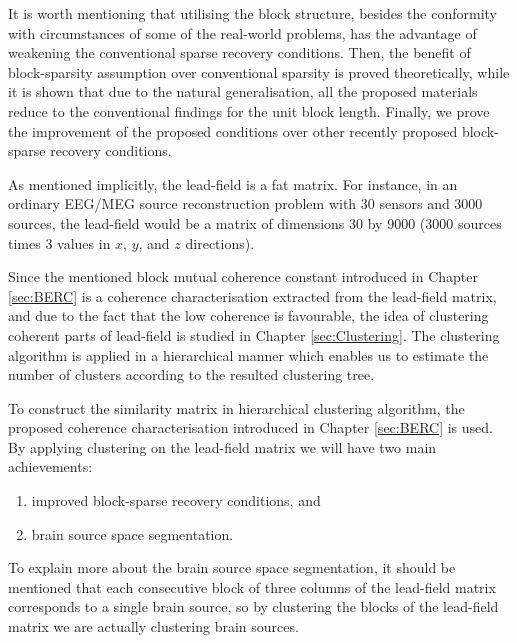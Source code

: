 It is worth mentioning that utilising the block structure, besides the conformity with circumstances of some of the real-world problems, has the advantage of weakening the conventional sparse recovery conditions.
Then, the benefit of block-sparsity assumption over conventional sparsity is proved theoretically, while it is shown that due to the natural generalisation, all the proposed materials reduce to the conventional findings for the unit block length.
Finally, we prove the improvement of the proposed conditions over other recently proposed block-sparse recovery conditions.

As mentioned implicitly, the lead-field is a fat matrix.
For instance, in an ordinary EEG/MEG source reconstruction problem with 30 sensors and 3000 sources, the lead-field would be a matrix of dimensions 30 by 9000 (3000 sources times 3 values in $x$, $y$, and $z$ directions).

Since the mentioned block mutual coherence constant introduced in Chapter \ref{sec:BERC} is a coherence characterisation extracted from the lead-field matrix, and due to the fact that the low coherence is favourable, the idea of clustering coherent parts of lead-field is studied in Chapter \ref{sec:Clustering}.
The clustering algorithm is applied in a hierarchical manner which enables us to estimate the number of clusters according to the resulted clustering tree. 

To construct the similarity matrix in hierarchical clustering algorithm, the proposed coherence characterisation introduced in Chapter \ref{sec:BERC} is used.
By applying clustering on the lead-field matrix we will have two main achievements: 
\begin{enumerate}
  \item improved block-sparse recovery conditions, and
  \item brain source space segmentation.
\end{enumerate}

To explain more about the brain source space segmentation, it should be mentioned that each consecutive block of three columns of the lead-field matrix corresponds to a single brain source, so by clustering the blocks of the lead-field matrix we are actually clustering brain sources.

